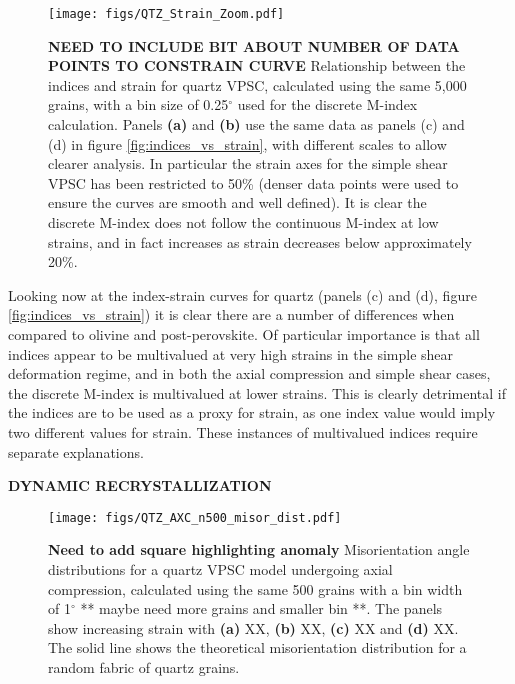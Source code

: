 \documentclass[a4paper,12pt,twoside]{report}
\numberwithin{equation}{chapter}
\begin{document}
\begin{figure}[h]
  \centering
    \texttt{[image: figs/QTZ\_Strain\_Zoom.pdf]}
  \caption[Relation of indices to strain (quartz VPSC)]{\textbf{NEED TO INCLUDE BIT ABOUT NUMBER OF DATA POINTS TO CONSTRAIN CURVE} Relationship between the indices and strain for quartz VPSC, calculated using the same 5,000 grains, with a bin size of 0.25$^\circ$ used for the discrete M-index calculation. Panels \textbf{(a)} and \textbf{(b)} use the same data as panels (c) and (d) in figure \ref{fig:indices_vs_strain}, with different scales to allow clearer analysis. In particular the strain axes for the simple shear VPSC has been restricted to 50\% (denser data points were used to ensure the curves are smooth and well defined). It is clear the discrete M-index does not follow the continuous M-index at low strains, and in fact increases as strain decreases below approximately 20\%.}
  \label{fig:indices_vs_strain_qtz}
\end{figure} 

Looking now at the index-strain curves for quartz (panels (c) and (d), figure \ref{fig:indices_vs_strain}) it is clear there are a number of differences when compared to olivine and post-perovskite. Of particular importance is that all indices appear to be multivalued at very high strains in the simple shear deformation regime, and in both the axial compression and simple shear cases, the discrete M-index is multivalued at lower strains. This is clearly detrimental if the indices are to be used as a proxy for strain, as one index value would imply two different values for strain. These instances of multivalued indices require separate explanations.

\textbf{DYNAMIC RECRYSTALLIZATION}


\begin{figure}[h]
  \centering
    \texttt{[image: figs/QTZ\_AXC\_n500\_misor\_dist.pdf]}
  \caption[Misorientation angle distribution (quartz VPSC)]{\textbf{Need to add square highlighting anomaly} Misorientation angle distributions for a quartz VPSC model undergoing axial compression, calculated using the same 500 grains with a bin width of 1$^{\circ}$ ** maybe need more grains and smaller bin **. The panels show increasing strain with \textbf{(a)} XX, \textbf{(b)} XX, \textbf{(c)} XX and \textbf{(d)} XX. The solid line shows the theoretical misorientation distribution for a random fabric of quartz grains.} 
  \label{fig:qtz_misorientation_dist}
\end{figure} 
\end{document}
